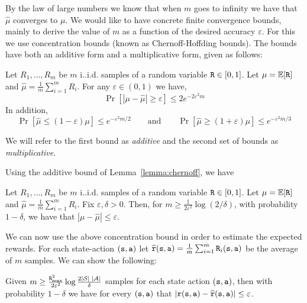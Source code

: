 By the law of large numbers we know that when $m$ goes to infinity
we have that $\widehat{\mu}$ converges to $\mu$. We would like to
have concrete finite convergence bounds, mainly to derive the value
of $m$ as a function of the desired accuracy $\varepsilon$.
%
For this we use concentration bounds (known as Chernoff-Hoffding
bounds). The bounds have both an additive form and a multiplicative
form, given as follows:
\begin{lemma}
\label{lemma:chernoff}
%
Let $R_1, \ldots, R_m$ be $m$ i..i.d. samples of a random variable
${\tt R}\in[0,1]$. Let $\mu=\mathbb{E}[{\tt R}]$ and
$\widehat{\mu}=\frac{1}{m}\sum_{i=1}^m R_i$. For any
$\varepsilon\in(0,1)$ we have,
\[
\Pr[|\mu-\widehat{\mu}|\geq \varepsilon]\leq 2e^{-2\varepsilon^2 m}
\]
In addition, %
\[
\Pr[\widehat{\mu}\leq (1-\varepsilon)\mu]\leq e^{-\varepsilon^2 m
/2}\qquad \mbox{and}\qquad
 \Pr[\widehat{\mu}\geq
(1+\varepsilon)\mu]\leq e^{-\varepsilon^2 m /3}
\]
\end{lemma}
We will refer to the first bound as {\em additive} and the second
set of bounds as {\em multiplicative}.

Using the additive bound of Lemma~\ref{lemma:chernoff}, we have
\begin{corollary}
\label{cor:chernoff}
 Let $R_1, \ldots, R_m$ be $m$
i..i.d. samples of a random variable ${\tt R}\in[0,1]$. Let
$\mu=\mathbb{E}[{\tt R}]$ and $\widehat{\mu}=\frac{1}{m}\sum_{i=1}^m R_i$.
Fix $\varepsilon,\delta>0$. Then, for $m\geq
\frac{1}{2\varepsilon^2}\log (2/\delta)$, with probability
$1-\delta$, we have that $|\mu-\widehat{\mu}|\leq \varepsilon$.
\end{corollary}


We can now use the above concentration bound in order to estimate
the expected rewards. For each state-action $({\tt s},{\tt a})$ let
$\widehat{{\tt r}}({\tt s},{\tt a})=\frac{1}{m}\sum_{i=1}^m
{\tt R}_i({\tt s},{\tt a})$ be the average of $m$ samples. We can
show the following:

\begin{claim}
\label{claim:sample}
%
Given $m\geq \frac{{\tt R}_{\max }^2}{2\varepsilon^2}\log \frac{2|\mathcal{S}|
\;|\mathcal{A}|}{\delta}$ samples for each state action
$({\tt s},{\tt a})$, then with probability $1-\delta$ we have for
every $({\tt s},{\tt a})$ that
$|{\tt r}({\tt s},{\tt a})-\widehat{{\tt r}}({\tt s},{\tt a})|\leq
\varepsilon$.
\end{claim}

